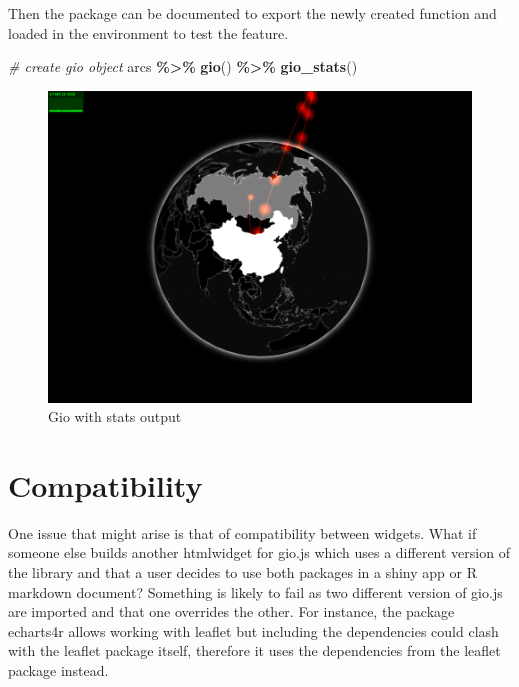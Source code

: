 \documentclass[
]{krantz}
\makeatletter
\newenvironment{Shaded}{\begin{snugshade}}{\end{snugshade}}
\newcommand{\CommentTok}[1]{\textcolor[rgb]{0.37,0.37,0.37}{\textit{#1}}}
\newcommand{\KeywordTok}[1]{\textcolor[rgb]{0.27,0.27,0.27}{\textbf{#1}}}
\newcommand{\NormalTok}[1]{#1}
\newcommand{\OperatorTok}[1]{\textcolor[rgb]{0.43,0.43,0.43}{\textbf{#1}}}
\newcommand{\StringTok}[1]{\textcolor[rgb]{0.5,0.5,0.5}{#1}}
\newenvironment{kframe}{%
\medskip{}
\setlength{\fboxsep}{.8em}
 \def\at@end@of@kframe{}%
 \ifinner\ifhmode%
  \def\at@end@of@kframe{\end{minipage}}%
  \begin{minipage}{\columnwidth}%
 \fi\fi%
 \def\FrameCommand##1{\hskip\@totalleftmargin \hskip-\fboxsep
 \colorbox{shadecolor}{##1}\hskip-\fboxsep
     \hskip-\linewidth \hskip-\@totalleftmargin \hskip\columnwidth}%
 \MakeFramed {\advance\hsize-\width
   \@totalleftmargin\z@ \linewidth\hsize
   \@setminipage}}%
 {\par\unskip\endMakeFramed%
 \at@end@of@kframe}
\renewenvironment{Shaded}{\begin{kframe}}{\end{kframe}}
\makeatother
\begin{document}
Then the package can be documented to export the newly created function and loaded in the environment to test the feature.

\begin{Shaded}
\begin{Highlighting}[]
\CommentTok{\# create gio object}
\NormalTok{arcs }\OperatorTok{\%>\%}\StringTok{ }
\StringTok{  }\KeywordTok{gio}\NormalTok{() }\OperatorTok{\%>\%}\StringTok{ }
\StringTok{  }\KeywordTok{gio\_stats}\NormalTok{()}
\end{Highlighting}
\end{Shaded}

\begin{figure}
\centering
\includegraphics{images/stats.png}
\caption{Gio with stats output}
\end{figure}

\hypertarget{compatibility}{%
\section{Compatibility}\label{compatibility}}

One issue that might arise is that of compatibility between widgets. What if someone else builds another htmlwidget for gio.js which uses a different version of the library and that a user decides to use both packages in a shiny app or R markdown document? Something is likely to fail as two different version of gio.js are imported and that one overrides the other. For instance, the package echarts4r \citep{R-echarts4r} allows working with leaflet but including the dependencies could clash with the leaflet package itself, therefore it uses the dependencies from the leaflet package instead.
\end{document}
